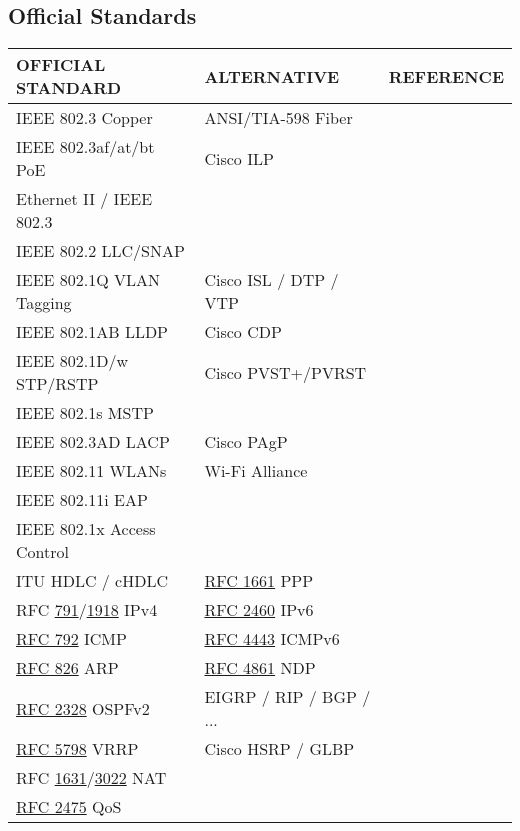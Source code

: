 \documentclass[12pt]{article}
\newcommand{\rfc}[1]{\href{https://datatracker.ietf.org/doc/html/rfc#1}{#1}}
\newcommand{\RFC}[1]{\href{https://datatracker.ietf.org/doc/html/rfc#1}{RFC #1}}
\begin{document}
	\subsection{Official Standards \label{subsec:STANDARDS}}
	\begin{table}[H]
	\centering
	\begin{tabular}{@{} l l r @{}}
	\textbf{OFFICIAL STANDARD}		& \textbf{ALTERNATIVE}		& \textbf{REFERENCE}\\\hline
	IEEE 802.3 Copper				& ANSI/TIA-598 Fiber		& \Cref{subsec:CABLING}\\
	IEEE 802.3af/at/bt PoE			& Cisco ILP				& \Cref{tab:POE}\\\hline
	Ethernet II / IEEE 802.3			&					& \Cref{subsec:802.3 ETHERNET}\\
	IEEE 802.2 LLC/SNAP			&					& \Cref{tab:802.2 LLC,tab:802.2 SNAP}\\
	IEEE 802.1Q VLAN Tagging		& Cisco ISL / DTP / VTP		& \Cref{subsec:VLAN TAGGING,subsec:CISCO VTP}\\
	IEEE 802.1AB LLDP			& Cisco CDP			& \Cref{subsec:CDP/802.1AB}\\
	IEEE 802.1D/w STP/RSTP			& Cisco PVST+/PVRST		& \Cref{subsec:802.1D/w}\\
	IEEE 802.1s MSTP				&					&\\
	IEEE 802.3AD LACP			& Cisco PAgP			&\\
	IEEE 802.11 WLANs			& Wi-Fi Alliance			& \Cref{subsec:802.11 WLANS}\\
	IEEE 802.11i EAP				&					& \Cref{tab:WIRELESS SECURITY}\\
	IEEE 802.1x Access Control		&					& \Cref{tab:WIRELESS SECURITY}\\
	ITU HDLC / cHDLC			& \RFC{1661} PPP			& \Cref{subsec:ITU HDLC,subsec:IETF PPP}\\\hline
	RFC \rfc{791}/\rfc{1918} IPv4		& \RFC{2460} IPv6		& \Cref{subsec:IPV4,subsec:IPV6}\\
	\RFC{792} ICMP				& \RFC{4443} ICMPv6		& \Cref{subsec:ICMP}\\
	\RFC{826} ARP				& \RFC{4861} NDP		& \Cref{subsec:ARP,subsec:NDP}\\
	\RFC{2328} OSPFv2			& EIGRP / RIP / BGP / ...		& \Cref{subsec:OSPF}\\
	\RFC{5798} VRRP				& Cisco HSRP / GLBP		&\\
	RFC \rfc{1631}/\rfc{3022} NAT		&					&\\
	\RFC{2475} QoS				&					& \Cref{sec:QOS}\\

\end{tabular}
\end{table}
\end{document}
